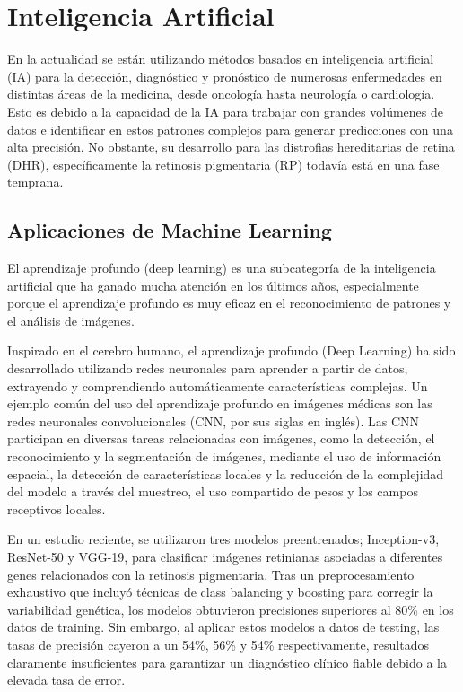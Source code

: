\documentclass[11pt,spanish,listoffigures,listoftables]{tfgetsinf}
\begin{document}
\section{Inteligencia Artificial}

En la actualidad se están utilizando métodos basados en inteligencia artificial (IA) para la detección, diagnóstico y pronóstico de numerosas enfermedades en distintas áreas de la medicina, desde oncología hasta neurología o cardiología. Esto es debido a la capacidad de la IA para trabajar con grandes volúmenes de datos e identificar en estos patrones complejos para generar predicciones con una alta precisión\cite{FER}. No obstante, su desarrollo para las distrofias hereditarias de retina (DHR), específicamente la retinosis pigmentaria (RP) todavía está en una fase temprana.

\subsection{Aplicaciones de Machine Learning}

El aprendizaje profundo (deep learning) es una subcategoría de la inteligencia artificial que ha ganado mucha atención en los últimos años, especialmente porque el aprendizaje profundo es muy eficaz en el reconocimiento de patrones y el análisis de imágenes\cite{STE}.

Inspirado en el cerebro humano, el aprendizaje profundo (Deep Learning) ha sido desarrollado utilizando redes neuronales para aprender a partir de datos, extrayendo y comprendiendo automáticamente características complejas. Un ejemplo común del uso del aprendizaje profundo en imágenes médicas son las redes neuronales convolucionales (CNN, por sus siglas en inglés). Las CNN participan en diversas tareas relacionadas con imágenes, como la detección, el reconocimiento y la segmentación de imágenes, mediante el uso de información espacial, la detección de características locales y la reducción de la complejidad del modelo a través del muestreo, el uso compartido de pesos y los campos receptivos locales\cite{SHE}.

En un estudio reciente, se utilizaron tres modelos preentrenados; Inception-v3, ResNet-50 y VGG-19, para clasificar imágenes retinianas asociadas a diferentes genes relacionados con la retinosis pigmentaria. Tras un preprocesamiento exhaustivo que incluyó técnicas de class balancing y boosting para corregir la variabilidad genética, los modelos obtuvieron precisiones superiores al 80\% en los datos de training\cite{FER}. Sin embargo, al aplicar estos modelos a datos de testing, las tasas de precisión cayeron a un 54\%, 56\% y 54\% respectivamente, resultados claramente insuficientes para garantizar un diagnóstico clínico fiable debido a la elevada tasa de error.
\end{document}
